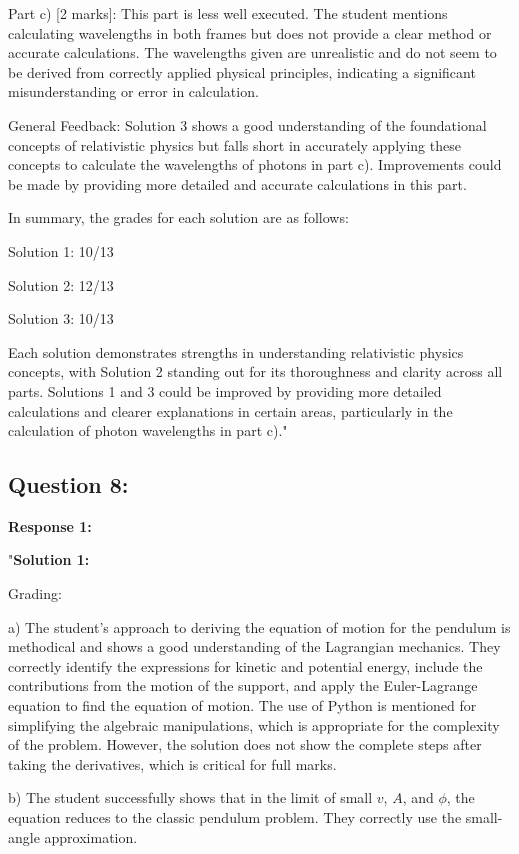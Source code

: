\documentclass[a4paper,11pt]{article}
\begin{document}
Part c) [2 marks]: This part is less well executed. The student mentions calculating wavelengths in both frames but does not provide a clear method or accurate calculations. The wavelengths given are unrealistic and do not seem to be derived from correctly applied physical principles, indicating a significant misunderstanding or error in calculation.

General Feedback: Solution 3 shows a good understanding of the foundational concepts of relativistic physics but falls short in accurately applying these concepts to calculate the wavelengths of photons in part c). Improvements could be made by providing more detailed and accurate calculations in this part.

In summary, the grades for each solution are as follows:

Solution 1: 10/13

Solution 2: 12/13

Solution 3: 10/13

Each solution demonstrates strengths in understanding relativistic physics concepts, with Solution 2 standing out for its thoroughness and clarity across all parts. Solutions 1 and 3 could be improved by providing more detailed calculations and clearer explanations in certain areas, particularly in the calculation of photon wavelengths in part c)."

\subsection*{Question 8:}

\textbf{Response 1:}

"\textbf{Solution 1:}

Grading:

a) The student's approach to deriving the equation of motion for the pendulum is methodical and shows a good understanding of the Lagrangian mechanics. They correctly identify the expressions for kinetic and potential energy, include the contributions from the motion of the support, and apply the Euler-Lagrange equation to find the equation of motion. The use of Python is mentioned for simplifying the algebraic manipulations, which is appropriate for the complexity of the problem. However, the solution does not show the complete steps after taking the derivatives, which is critical for full marks.

b) The student successfully shows that in the limit of small \( v \), \( A \), and \( \phi \), the equation reduces to the classic pendulum problem. They correctly use the small-angle approximation.
\end{document}
